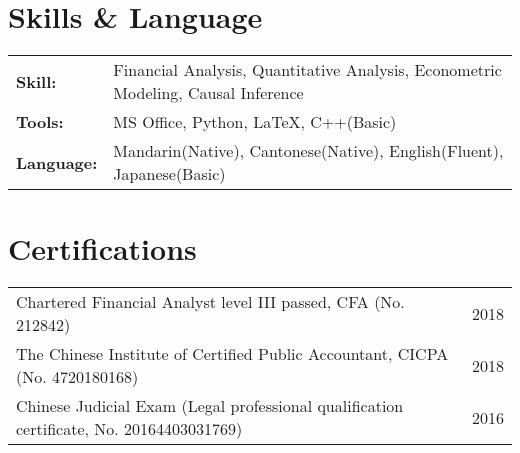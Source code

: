 \documentclass[a4paper,12pt]{article}
\begin{document}
\vspace{-10pt}
\section{Skills \& Language}
\vspace{-5pt}
\begin{tabularx}{\linewidth}{@{}l X@{}}
\textbf{Skill:} &  \normalsize{Financial Analysis, Quantitative Analysis, Econometric Modeling, Causal Inference}\\
\textbf{Tools:} &  \normalsize{ MS Office, Python, \textrm{\LaTeX}, C++(Basic)}\\
\textbf{Language:} &  \normalsize{Mandarin(Native), Cantonese(Native), English(Fluent), Japanese(Basic)}\\
\end{tabularx}

\vspace{-10pt}
\section{Certifications}
\vspace{-5pt}
\begin{tabularx}{\linewidth}{@{}l X@{}}
Chartered Financial Analyst level III passed, CFA (No. 212842)   & \hfill \normalsize 2018\\
The Chinese Institute of Certified Public Accountant, CICPA (No. 4720180168) & \hfill  \normalsize 2018\\
Chinese Judicial Exam (Legal professional qualification certificate, No. 20164403031769)  &  \hfill  \normalsize 2016\\
\end{tabularx}

\end{document}
